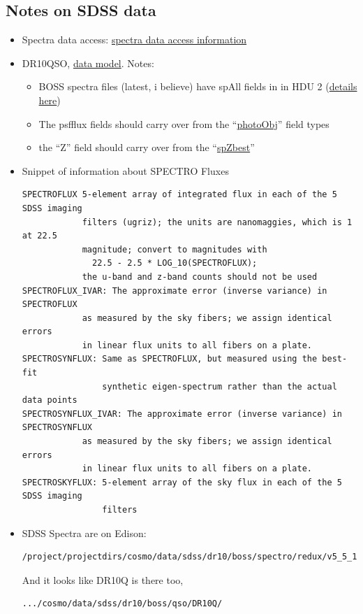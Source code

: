 \documentclass[11pt]{article}
\begin{document}
\subsection{Notes on SDSS data}
\begin{itemize} \itemsep 0pt
\item Spectra data access: \href{https://www.sdss3.org/dr10/spectro/spectro_access.php}{spectra data access information}
\item DR10QSO, \href{http://data.sdss3.org/datamodel/files/BOSS_QSO/DR10Q/DR10Q.html}{data model}.  Notes: 
  \begin{itemize}
  \item BOSS spectra files (latest, i believe) have spAll fields in in HDU 2 (\href{http://data.sdss3.org/datamodel/files/BOSS_SPECTRO_REDUX/RUN2D/spAll.html}{details here})
  \item The psfflux fields should carry over from the ``\href{http://data.sdss3.org/datamodel/files/BOSS_PHOTOOBJ/RERUN/RUN/CAMCOL/photoObj.html}{photoObj}'' field types
  \item the ``Z'' field should carry over from the ``\href{http://data.sdss3.org/datamodel/files/BOSS_SPECTRO_REDUX/RUN2D/PLATE4/RUN1D/spZbest.html}{spZbest}''
  \end{itemize}
\item Snippet of information about SPECTRO Fluxes
\begin{verbatim}
SPECTROFLUX 5-element array of integrated flux in each of the 5 SDSS imaging
            filters (ugriz); the units are nanomaggies, which is 1 at 22.5
            magnitude; convert to magnitudes with
              22.5 - 2.5 * LOG_10(SPECTROFLUX);
            the u-band and z-band counts should not be used
SPECTROFLUX_IVAR: The approximate error (inverse variance) in SPECTROFLUX
            as measured by the sky fibers; we assign identical errors
            in linear flux units to all fibers on a plate.
SPECTROSYNFLUX: Same as SPECTROFLUX, but measured using the best-fit
                synthetic eigen-spectrum rather than the actual data points
SPECTROSYNFLUX_IVAR: The approximate error (inverse variance) in SPECTROSYNFLUX
            as measured by the sky fibers; we assign identical errors
            in linear flux units to all fibers on a plate.
SPECTROSKYFLUX: 5-element array of the sky flux in each of the 5 SDSS imaging
                filters
\end{verbatim}

\item SDSS Spectra are on Edison: 
\begin{verbatim}
/project/projectdirs/cosmo/data/sdss/dr10/boss/spectro/redux/v5_5_12/spectra
\end{verbatim}
And it looks like DR10Q is there too,
\begin{verbatim}
.../cosmo/data/sdss/dr10/boss/qso/DR10Q/
\end{verbatim}


\end{itemize}
\end{document}
